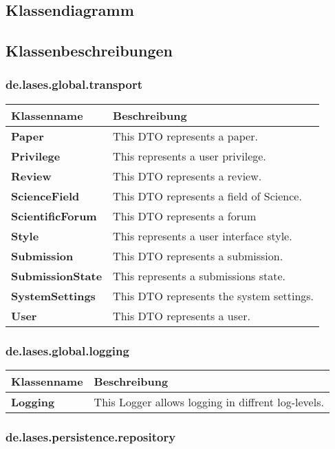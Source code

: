 
\newcommand{\classtable}[1]{\begin{longtable}[H]{m{5cm}m{9cm}}
		\hline
		\textbf{Klassenname} & \textbf{Beschreibung} \\
		\hline
		\hline
		#1
	\end{longtable}
}

\newcommand{\classentry}[2]{\textbf{#1} & #2 \\
}


\subsection{Klassendiagramm}


\subsection{Klassenbeschreibungen}

\subsubsection{de.lases.global.transport}

\classtable{
    \classentry{Paper}{This DTO represents a paper.}
    \classentry{Privilege}{This represents a user privilege.}
    \classentry{Review}{This DTO represents a review.}
    \classentry{ScienceField}{This DTO represents a field of Science.}
    \classentry{ScientificForum}{This DTO represents a forum}
    \classentry{Style}{This represents a user interface style.}
    \classentry{Submission}{This DTO represents a submission.}
    \classentry{SubmissionState}{This represents a submissions state.}
    \classentry{SystemSettings}{This DTO represents the system settings.}
    \classentry{User}{This DTO represents a user.}
}

\subsubsection{de.lases.global.logging}

\classtable{
    \classentry{Logging}{This Logger allows logging in diffrent log-levels.}
}

\subsubsection{de.lases.persistence.repository}

